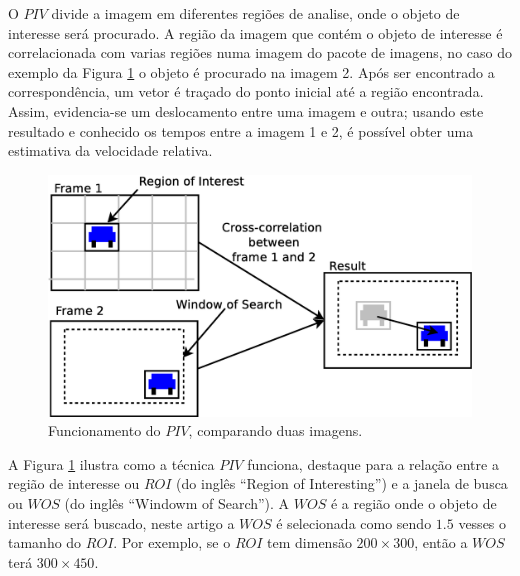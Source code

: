 O $PIV$ divide a imagem em diferentes regiões de analise, onde o objeto de interesse será procurado. 
A região da imagem que contém o objeto de interesse  é correlacionada 
com varias regiões numa imagem do pacote de imagens, no caso do exemplo da 
Figura \ref{fig:twoframes} o objeto é procurado na imagem 2. 
Após ser encontrado a correspondência, um vetor é traçado do ponto inicial
até a região encontrada. Assim, evidencia-se um deslocamento entre uma imagem e outra; usando este resultado
e conhecido os tempos entre a imagem 1 e 2,
é possível obter uma  estimativa da velocidade relativa.

\begin{figure}[H]
\includegraphics[width=\columnwidth]{images/explanationPIV.eps}
\caption{Funcionamento do $PIV$, comparando duas imagens.}
\label{fig:twoframes}
\end{figure}

A Figura \ref{fig:twoframes} ilustra como a técnica $PIV$ funciona, 
destaque para a relação entre a região de interesse ou $ROI$ (do inglês ``Region of Interesting'') e 
a janela de busca ou $WOS$  (do inglês ``Windowm of Search''). 
A $WOS$ é a região onde o objeto de interesse será buscado,
neste artigo a $WOS$ é selecionada como sendo $1.5$ vesses o tamanho do $ROI$. 
Por exemplo, se o $ROI$ tem dimensão $200\times300$, então a $WOS$ terá $300\times450$.


